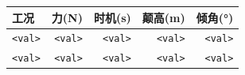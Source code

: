 \begin{tabular}{lrrrr}
\toprule
\textbf{工况} & \textbf{力(N)} & \textbf{时机(s)} & \textbf{颠高(m)} & \textbf{倾角(°)} \\\midrule
\texttt{<val>} & \texttt{<val>} & \texttt{<val>} & \texttt{<val>} & \texttt{<val>} \\
\texttt{<val>} & \texttt{<val>} & \texttt{<val>} & \texttt{<val>} & \texttt{<val>} \\\bottomrule
\end{tabular}
